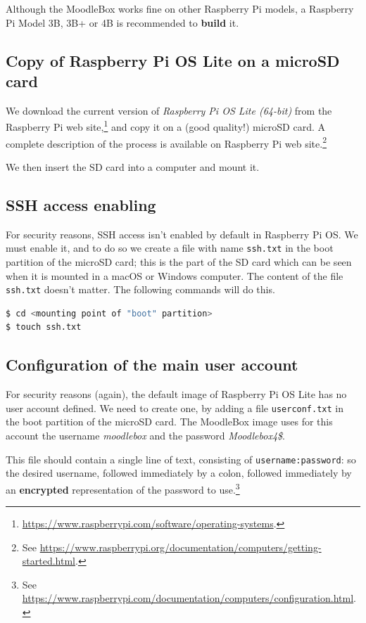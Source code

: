 \documentclass[12pt]{article}
\begin{document}
Although the MoodleBox works fine on other Raspberry Pi models, a Raspberry Pi Model 3B, 3B+ or 4B is recommended to \textbf{build} it.

\subsection{Copy of Raspberry Pi OS Lite on a microSD card}

We download the current version of \emph{Raspberry Pi OS Lite (64-bit)} from the Raspberry Pi web site,\footnote{\url{https://www.raspberrypi.com/software/operating-systems}.} and copy it on a (good quality!) microSD card.
A complete description of the process is available on Raspberry Pi web site.\footnote{See \url{https://www.raspberrypi.org/documentation/computers/getting-started.html}.}

We then insert the SD card into a computer and mount it.

\subsection{SSH access enabling}

For security reasons, SSH access isn't enabled by default in Raspberry Pi OS.
We must enable it, and to do so we create a file with name \lstinline{ssh.txt} in the boot partition of the microSD card; this is the part of the SD card which can be seen when it is mounted in a macOS or Windows computer.
The content of the file \lstinline{ssh.txt} doesn't matter.
The following commands will do this.

\begin{lstlisting}[language=bash]
$ cd <mounting point of "boot" partition>
$ touch ssh.txt
\end{lstlisting}

\subsection{Configuration of the main user account}\label{ssec-new-account}

For security reasons (again), the default image of Raspberry Pi OS Lite has no user account defined.
We need to create one, by adding a file \lstinline{userconf.txt} in the boot partition of the microSD card.
The MoodleBox image uses for this account the username \emph{moodlebox} and the password \emph{Moodlebox4\$}.

This file should contain a single line of text, consisting of \lstinline{username:password}: so the desired username, followed immediately by a colon, followed immediately by an \textbf{encrypted} representation of the password to use.\footnote{See \url{https://www.raspberrypi.com/documentation/computers/configuration.html}.}
\end{document}
